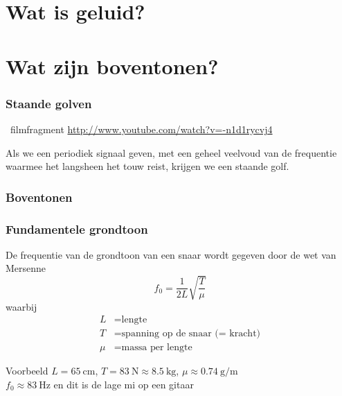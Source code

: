 \documentclass[compress, darktitle, framenumber, totalframenumber]{beamer}
\begin{document}
\section{Wat is geluid?}

\section{Wat zijn boventonen?}

\begin{frame}
  \frametitle{Staande golven}

  \begin{block}{\Forward\ filmfragment}
    \url{http://www.youtube.com/watch?v=-n1d1rycvj4}
  \end{block}

  \pause

  Als we een periodiek signaal geven, met een geheel veelvoud van de frequentie waarmee het langsheen het touw reist, krijgen we een staande golf.
\end{frame}

\begin{frame}
  \frametitle{Boventonen}

  \centering
\end{frame}

\begin{frame}
  \frametitle{Fundamentele grondtoon}

  De frequentie van de grondtoon van een snaar wordt gegeven door de \alert{wet van Mersenne}
  \begin{equation}
    f_0=\frac{1}{2L}\sqrt{\frac{T}{\mu}}
  \end{equation}
  waarbij
  \begin{equation}
    \begin{aligned}
      L&=\text{lengte} \\
      T&=\text{spanning op de snaar (= kracht)} \\
      \mu&=\text{massa per lengte}
    \end{aligned}
  \end{equation}
  \pause
  \begin{block}{Voorbeeld}
    $L=\SI{65}{\centi\meter}$, $T=\SI{83}{\newton}\approx\SI{8.5}{\kilo\gram}$, $\mu\approx\SI{0.74}{\gram\per\meter}$ \\
    $f_0\approx\SI{83}{\hertz}$ en dit is de lage mi op een gitaar
  \end{block}
\end{frame}
\end{document}
